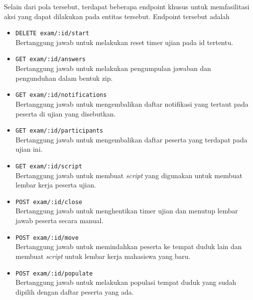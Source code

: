     Selain dari pola tersebut, terdapat beberapa endpoint khusus untuk memfasilitasi aksi yang dapat
    dilakukan pada entitas tersebut. Endpoint tersebut adalah
    \begin{itemize}
        \item \texttt{DELETE exam/:id/start} \\
            Bertanggung jawab untuk melakukan reset timer ujian pada id tertentu.
            
        \item \texttt{GET exam/:id/answers} \\
            Bertanggung jawab untuk melakukan pengumpulan jawaban dan pengunduhan dalam bentuk zip.
            
        \item \texttt{GET exam/:id/notifications} \\
            Bertanggung jawab untuk mengembalikan daftar notifikasi yang tertaut pada peserta di ujian
            yang disebutkan.
            
        \item \texttt{GET exam/:id/participants} \\
            Bertanggung jawab untuk mengembalikan daftar peserta yang terdapat pada ujian ini.
            
        \item \texttt{GET exam/:id/script} \\
            Bertanggung jawab untuk membuat \textit{script} yang digunakan untuk membuat lembar kerja
            peserta ujian.
            
        \item \texttt{POST exam/:id/close} \\
            Bertanggung jawab untuk menghentikan timer ujian dan menutup lembar jawab peserta
            secara manual.
            
        \item \texttt{POST exam/:id/move} \\
            Bertanggung jawab untuk memindahkan peserta ke tempat duduk lain dan membuat \textit{script}
            untuk lembar kerja mahasiswa yang baru.
            
        \item \texttt{POST exam/:id/populate} \\
            Bertanggung jawab untuk melakukan populasi tempat duduk yang sudah dipilih dengan daftar peserta
            yang ada.
            

\end{itemize}
